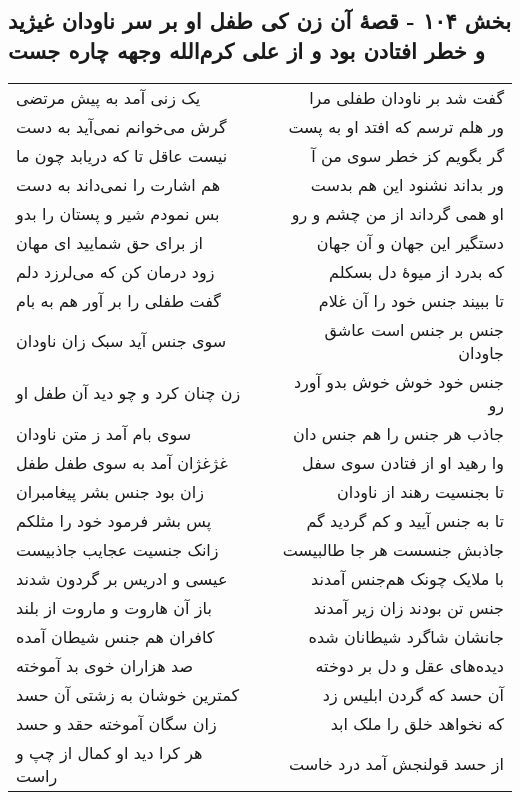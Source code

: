 \begin{center}
\section*{بخش ۱۰۴ - قصهٔ آن زن کی طفل او بر سر ناودان غیژید و خطر افتادن بود و از علی کرم‌الله وجهه چاره جست}
\label{sec:sh104}
\begin{longtable}{l p{0.5cm} r}
یک زنی آمد به پیش مرتضی
&&
گفت شد بر ناودان طفلی مرا
\\
گرش می‌خوانم نمی‌آید به دست
&&
ور هلم ترسم که افتد او به پست
\\
نیست عاقل تا که دریابد چون ما
&&
گر بگویم کز خطر سوی من آ
\\
هم اشارت را نمی‌داند به دست
&&
ور بداند نشنود این هم بدست
\\
بس نمودم شیر و پستان را بدو
&&
او همی گرداند از من چشم و رو
\\
از برای حق شمایید ای مهان
&&
دستگیر این جهان و آن جهان
\\
زود درمان کن که می‌لرزد دلم
&&
که بدرد از میوهٔ دل بسکلم
\\
گفت طفلی را بر آور هم به بام
&&
تا ببیند جنس خود را آن غلام
\\
سوی جنس آید سبک زان ناودان
&&
جنس بر جنس است عاشق جاودان
\\
زن چنان کرد و چو دید آن طفل او
&&
جنس خود خوش خوش بدو آورد رو
\\
سوی بام آمد ز متن ناودان
&&
جاذب هر جنس را هم جنس دان
\\
غژغژان آمد به سوی طفل طفل
&&
وا رهید او از فتادن سوی سفل
\\
زان بود جنس بشر پیغامبران
&&
تا بجنسیت رهند از ناودان
\\
پس بشر فرمود خود را مثلکم
&&
تا به جنس آیید و کم گردید گم
\\
زانک جنسیت عجایب جاذبیست
&&
جاذبش جنسست هر جا طالبیست
\\
عیسی و ادریس بر گردون شدند
&&
با ملایک چونک هم‌جنس آمدند
\\
باز آن هاروت و ماروت از بلند
&&
جنس تن بودند زان زیر آمدند
\\
کافران هم جنس شیطان آمده
&&
جانشان شاگرد شیطانان شده
\\
صد هزاران خوی بد آموخته
&&
دیده‌های عقل و دل بر دوخته
\\
کمترین خوشان به زشتی آن حسد
&&
آن حسد که گردن ابلیس زد
\\
زان سگان آموخته حقد و حسد
&&
که نخواهد خلق را ملک ابد
\\
هر کرا دید او کمال از چپ و راست
&&
از حسد قولنجش آمد درد خاست

\end{longtable}
\end{center}
